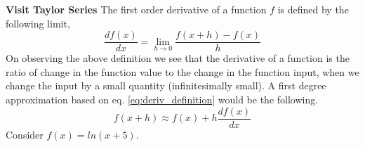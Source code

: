 \documentclass[solution,addpoints,12pt]{exam}
\begin{document}
\begin{questions}
\question  \textbf{Visit Taylor Series} The first order derivative of a function $f$ is defined by the following limit,
          \begin{equation} \label{eq:deriv_definition}
            \frac{df(x)}{dx} = \lim_{h \to 0} \frac{f(x + h) - f(x)}{h}
          \end{equation}
          On observing the above definition we see that the derivative of a function is the ratio of
          change in the function value to the change in the function input, 
          when we change the input by a small quantity (infinitesimally small).
          A first degree approximation based on eq. \ref{eq:deriv_definition} would be the following.
          \begin{equation}
            f(x+h) \approx f(x) + h \frac{df(x)}{dx}
          \end{equation}
          Consider $f(x) = ln(x+5)$. 
         \begin{parts}

\end{parts}
\end{questions}
\end{document}
